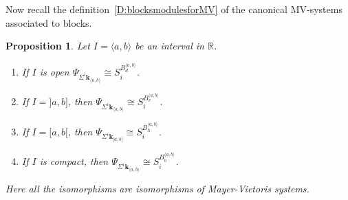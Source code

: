 \documentclass[a4paper, english, 11pt]{article}
\newcommand{\kk}[0]{\textbf{k}}
\newcommand{\0}{\vec{0}}
\newcommand{\R}[0]{\mathbb{R}}
\newtheorem{prop}{Proposition}[section]
\begin{document}
Now recall the definition~\ref{D:blocksmodulesforMV} of the canonical MV-systems associated to blocks.
\begin{prop}\label{P:PsionIntervals}  Let $I=\langle a, b\rangle$ be an interval in $\R$. 
\begin{enumerate}
    \item If $I$ is open  $\Psi_{\Sigma^i \kk_{\langle a, b\rangle}} \cong 
S_i^{B_{d}^{\langle a, b\rangle}}$.
    \item If $I=]a,b]$, then  $\Psi_{\Sigma^i \kk_{\langle a, b\rangle}} \cong 
S_i^{B_{v}^{\langle a, b\rangle}}$.
    \item If $I=[a, b[$, then  $\Psi_{\Sigma^i \kk_{[ a, b[}} \cong 
S_i^{B_{h}^{\langle a, b\rangle}}$. 
    \item If $I$ is compact, then  $\Psi_{\Sigma^i \kk_{\langle a, b\rangle}} \cong 
S_i^{B_{b}^{\langle a, b\rangle}}$. 
\end{enumerate}
Here all the isomorphisms are isomorphisms of Mayer-Vietoris systems.
\end{prop}
\end{document}
